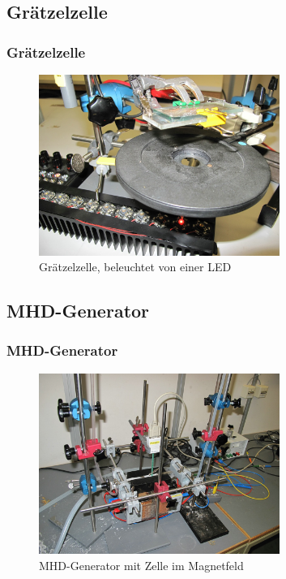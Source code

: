 \documentclass[10pt]{beamer}
\begin{document}
\subsection[]{Gr\"atzelzelle}
\frame
{
\frametitle{Gr\"atzelzelle}
\begin{figure}
\begin{center}
\includegraphics[width=0.7\textwidth]{./images/prIMG_3497.jpg}
\caption{Gr\"atzelzelle, beleuchtet von einer LED}
\end{center}
\end{figure}
}
\subsection[]{MHD-Generator}
\frame
{
\frametitle{MHD-Generator}
\begin{figure}
\begin{center}
\includegraphics[width=0.7\textwidth]{./images/prIMG_3768.jpg}
\caption{MHD-Generator mit Zelle im Magnetfeld}
\end{center}
\end{figure}
}
\end{document}
